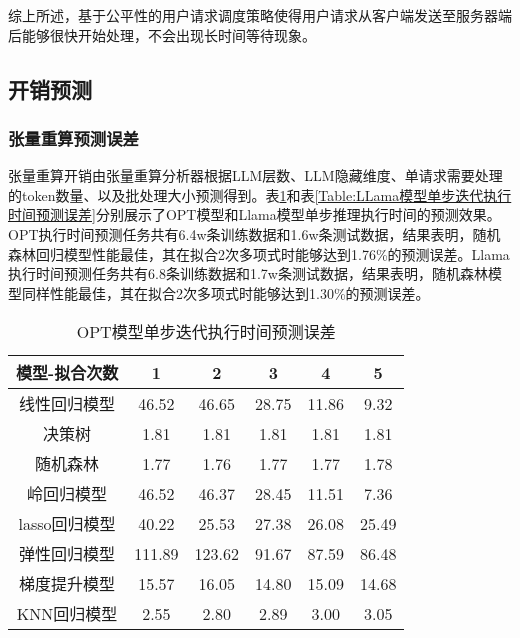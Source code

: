 综上所述，基于公平性的用户请求调度策略使得用户请求从客户端发送至服务器端后能够很快开始处理，不会出现长时间等待现象。

\subsection{开销预测}

\subsubsection{张量重算预测误差}

张量重算开销由张量重算分析器根据LLM层数、LLM隐藏维度、单请求需要处理的token数量、以及批处理大小预测得到。表\ref{Table:OPT模型单步迭代执行时间预测误差}和表\ref{Table:LLama模型单步迭代执行时间预测误差}分别展示了OPT模型和Llama模型单步推理执行时间的预测效果。OPT执行时间预测任务共有6.4w条训练数据和1.6w条测试数据，结果表明，随机森林回归模型性能最佳，其在拟合2次多项式时能够达到1.76\%的预测误差。Llama执行时间预测任务共有6.8条训练数据和1.7w条测试数据，结果表明，随机森林模型同样性能最佳，其在拟合2次多项式时能够达到1.30\%的预测误差。

\begin{table}[H]
  \centering
  \caption{OPT模型单步迭代执行时间预测误差}
  \label{Table:OPT模型单步迭代执行时间预测误差}
  \renewcommand{\arraystretch}{1.3}
  \small
  \begin{tabular}{c c c c c c}
    \toprule
    \textbf{模型-拟合次数} & \textbf{1} & \textbf{2} & \textbf{3} & \textbf{4} & \textbf{5} \\
    \midrule
    线性回归模型 & 46.52 & 46.65 & 28.75 & 11.86 & 9.32 \\ 
    决策树 & 1.81 & 1.81 & 1.81 & 1.81 & 1.81 \\ 
    随机森林 & 1.77 & 1.76 & 1.77 & 1.77 & 1.78 \\ 
    岭回归模型 & 46.52 & 46.37 & 28.45 & 11.51 & 7.36 \\ 
    lasso回归模型 & 40.22 & 25.53 & 27.38 & 26.08 & 25.49 \\ 
    弹性回归模型 & 111.89 & 123.62 & 91.67 & 87.59 & 86.48 \\ 
    梯度提升模型 & 15.57 & 16.05 & 14.80 & 15.09 & 14.68 \\ 
    KNN回归模型 & 2.55 & 2.80 & 2.89 & 3.00 & 3.05 \\ 
    \bottomrule
  \end{tabular}
\end{table}

